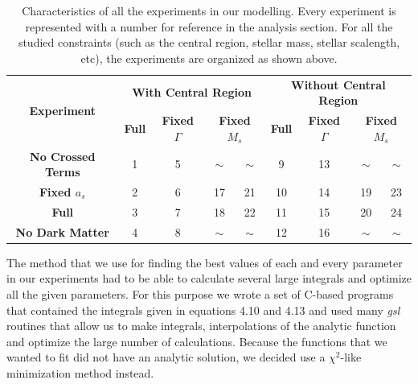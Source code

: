 \begin{table}[H]
\centering
\label{my-label}
\begin{tabular}{|c|c|c|c|c|c|c|c|c|}
\hline
\multicolumn{1}{|c|}{\multirow{3}{*}{\textbf{Experiment}}} & \multicolumn{4}{c|}{\multirow{2}{*}{\textbf{With Central Region}}}                      & \multicolumn{4}{c|}{\multirow{2}{*}{\textbf{Without Central Region}}}                     \\
\multicolumn{1}{|l|}{}                  & \multicolumn{4}{c|}{}                                                                   & \multicolumn{4}{c|}{}                                                                    \\ \cline{2-9} 
\multicolumn{1}{|l|}{}                  & \textbf{Full}    & \textbf{Fixed $\Gamma$}    & \multicolumn{2}{c|}{\textbf{Fixed $M_s$}} & \textbf{Full}     & \textbf{Fixed $\Gamma$}     & \multicolumn{2}{c|}{\textbf{Fixed $M_s$}} \\ \hline
\textbf{No Crossed Terms}               & 1                & 5                       & $\sim$               & $\sim$              & 9                 & 13                       & $\sim$               & $\sim$              \\ \hline
\textbf{Fixed $a_s$}                       & 2                & 6                       & 17                   & 21                  & 10                & 14                       & 19                   & 23                  \\ \hline
\textbf{Full}                           & 3                & 7                       & 18                   & 22                  & 11                & 15                       & 20                   & 24                  \\ \hline
\textbf{No Dark Matter}                 & 4                & 8                       & $\sim$               & $\sim$              & 12                & 16                       & $\sim$               & $\sim$              \\ \hline
\end{tabular}
\caption[Characteristics of all the experiments]{Characteristics of all the experiments in our modelling. Every experiment is represented with a number for reference in the analysis section. For all the studied constraints (such as the central region, stellar mass, stellar scalength, etc), the experiments are organized as shown above.}
\end{table}

The method that we use for finding the best values of each and every parameter in our experiments had to be able to calculate several large integrals and optimize all the given parameters. For this purpose we wrote a set of C-based programs that contained the integrals given in equations 4.10 and 4.13 and used many \textit{gsl} routines that allow us to make integrals, interpolations of the analytic function and optimize the large number of calculations. Because the functions that we wanted to fit did not have an analytic solution, we decided use a $\chi^{2}$-like minimization method instead. 

